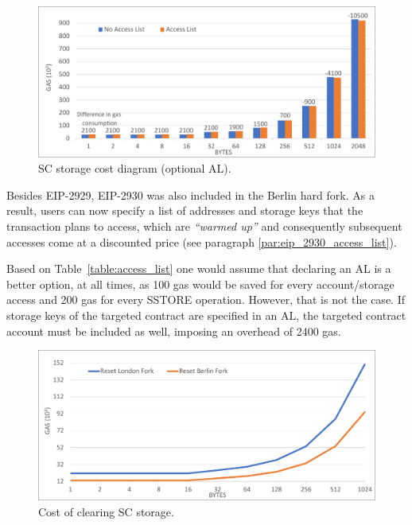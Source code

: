 \begin{figure}[htbp]
\centerline{\includegraphics[width=\textwidth]{figs/access_list.pdf}}
\caption{SC storage cost diagram (optional AL).}
\label{fig:access_list}
\end{figure}

Besides EIP-2929, EIP-2930 was also included in the Berlin hard fork. As a result, users can now specify a list of addresses and storage keys that the transaction plans to access, which are \emph{``warmed up''} and consequently subsequent accesses come at a discounted price (see paragraph \ref{par:eip_2930_access_list}).

Based on Table~\ref{table:access_list} one would assume that declaring an AL is a better option, at all times, as 100 gas would be saved for every account/storage access and 200 gas for every SSTORE operation. However, that is not the case. If storage keys of the targeted contract are specified in an AL, the targeted contract account must be included as well, imposing an overhead of 2400 gas.

\begin{figure}[htbp]
\centerline{\includegraphics[width=\textwidth]{figs/reset.pdf}}
\caption{Cost of clearing SC storage.}
\label{fig:reset}
\end{figure}

